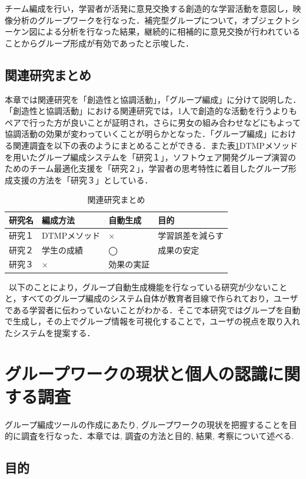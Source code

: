 \documentclass{funthesis}
\begin{document}
チーム編成を行い，学習者が活発に意見交換する創造的な学習活動を意図し，映像分析のグループワークを行なった．補完型グループについて，オブジェクトシーケン図による分析を行なった結果，継続的に相補的に意見交換が行われていることからグループ形成が有効であったと示唆した．



\section{関連研究まとめ}
本章では関連研究を「創造性と協調活動」，「グループ編成」に分けて説明した．「創造性と協調活動」における関連研究では，1人で創造的な活動を行うよりもペアで行った方が良いことが証明され，さらに男女の組み合わせなどにもよって協調活動の効果が変わっていくことが明らかとなった．「グループ編成」における関連調査を以下の表のようにまとめることができる．また表\ref{関連まとめ}DTMPメソッドを用いたグループ編成システムを「研究１」，ソフトウェア開発グループ演習のためのチーム最適化支援を「研究２」，学習者の思考特性に着目したグループ形成支援の方法を「研究３」としている．
\begin{table}[h]
\begin{center}
  \begin{tabular}{llll} \hline
    研究名 & 編成方法 & 自動生成 & 目的\tabularnewline \hline
    研究１& DTMPメソッド & × & 学習誤差を減らす\tabularnewline
    研究２&学生の成績 &◯&成果の安定\tabularnewline
    研究３&× & 効果の実証\tabularnewline
     \hline
  \end{tabular}
  \caption{関連研究まとめ}
  \label{関連まとめ}
  \end{center}
\end{table}



\ 以下のことにより，グループ自動生成機能を行なっている研究が少ないことと，すべてのグループ編成のシステム自体が教育者目線で作られており，ユーザである学習者に伝わっていないことがわかる．そこで本研究ではグループを自動で生成し，その上でグループ情報を可視化することで，ユーザの視点を取り入れたシステムを提案する．
\chapter{グループワークの現状と個人の認識に関する調査}

グループ編成ツールの作成にあたり,  グループワークの現状を把握することを目的に調査を行なった．本章では,  調査の方法と目的,  結果,  考察について述べる.
\section{目的}
\end{document}
